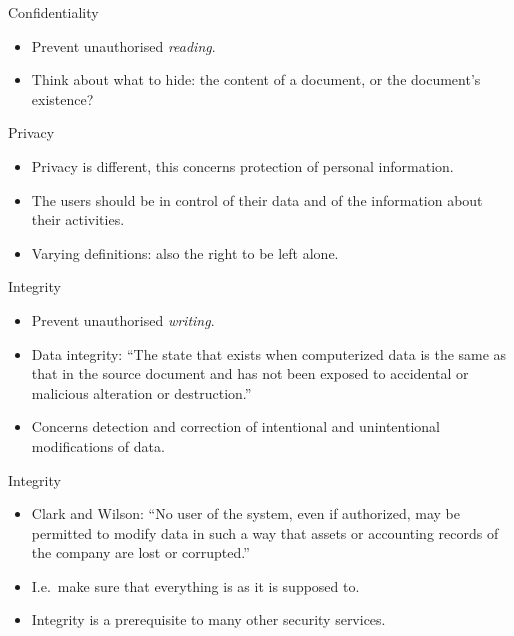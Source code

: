 \documentclass{beamer}
\begin{document}
\begin{frame}{Confidentiality}
  \begin{itemize}
    \item Prevent unauthorised \emph{reading}.

    \item Think about what to hide: the content of a document, or the 
      document's existence?
  \end{itemize}
\end{frame}

\begin{frame}{Privacy}
  \begin{itemize}
    \item Privacy is different, this concerns protection of personal 
      information.

    \item The users should be in control of their data and of the information 
      about their activities.

    \item Varying definitions: also the right to be left alone.
  \end{itemize}
\end{frame}

\begin{frame}{Integrity}
  \begin{itemize}
    \item Prevent unauthorised \emph{writing}.

    \item Data integrity: \enquote{The state that exists when computerized data 
        is the same as that in the source document and has not been exposed to 
        accidental or malicious alteration or destruction.}

    \item Concerns detection and correction of intentional and unintentional 
      modifications of data.
  \end{itemize}
\end{frame}

\begin{frame}{Integrity}
  \begin{itemize}
    \item Clark and Wilson:
      ``No user of the system, even if authorized, may be permitted to modify 
      data in such a way that assets or accounting records of the company are 
      lost or corrupted.''

    \item I.e.~make sure that everything is as it is supposed to.

    \item Integrity is a prerequisite to many other security services.
  \end{itemize}
\end{frame}
\end{document}

